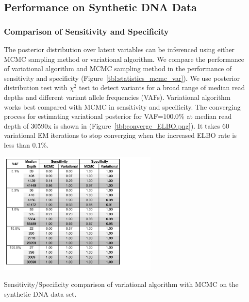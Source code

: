 \documentclass{article}
\begin{document}
\subsection{Performance on Synthetic DNA Data}
\subsubsection{Comparison of Sensitivity and Specificity}
The posterior distribution over latent variables can be inferenced using either MCMC sampling method or variational algorithm.
We compare the performance of variational algorithm and MCMC sampling method in the performance of sensitivity and specificity (Figure~\ref{tbl:statistics_mcmc_var}).
We use posterior distribution test with $\chi^2$ test to detect variants for a broad range of median read depths and different variant allele frequencies (VAFs).
Variational algorithm works best compared with MCMC in sensitivity and specificity.
The converging process for estimating variational posterior for VAF=$100.0\%$ at median read depth of 30590x is shown in (Figure~\ref{tbl:converge_ELBO.png}). It takes 60 variational EM iterations to stop converging when the increased ELBO rate is less than $0.1\%$. 



\begin{table}[h]
\centering
\vspace{-5pt}
\includegraphics[width=0.6\textwidth]{tables/statistics_mcmc_var.pdf}
\caption{Sensitivity/Specificity comparison of variational algorithm with MCMC on the synthetic DNA data set.}
\vspace{-10pt}
\label{tbl:statistics_mcmc_var}
\end{table}
\end{document}
